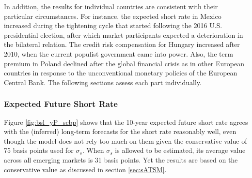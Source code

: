 {In addition, the results for individual countries are consistent with their particular circumstances.
For instance, the expected short rate in Mexico increased during the tightening cycle that started %
following the 2016 U.S. presidential election, after which market participants expected a deterioration in the bilateral relation.
The credit risk compensation for Hungary increased after 2010, when the current populist government came into power. 
Also, %
the term premium in Poland declined after the global financial crisis as in other European countries in response to the unconventional monetary policies of the European Central Bank.
The following sections assess each part individually.

\subsubsection{Expected Future Short Rate}
\iftoggle{toclinks}{\gototoc}{} %

Figure \ref{fig:bsl_yP_scbp} shows that the 10-year expected future short rate agrees with the (inferred) long-term forecasts for the short rate reasonably well, even though the model does not rely too much on them given the conservative value of 75 basis points used for \(\sigma_s\).
When \(\sigma_s\) is allowed to be estimated, its average value across all emerging markets is 31 basis points. Yet the results are based on the conservative value as discussed in section \ref{sec:sATSM}. %


}
